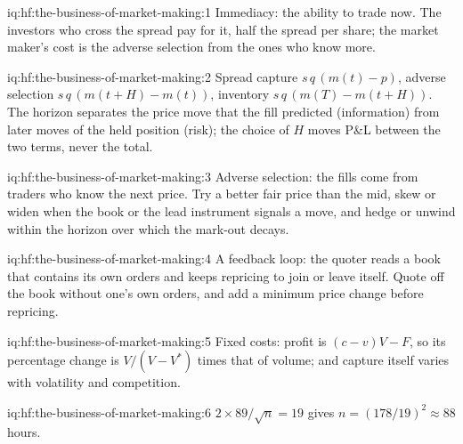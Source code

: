 \begin{solution}{iq:hf:the-business-of-market-making:1}
Immediacy: the ability to trade now. The investors who cross the spread pay for it, half the spread per share; the market maker's cost is the
adverse selection from the ones who know more.
\end{solution}

\begin{solution}{iq:hf:the-business-of-market-making:2}
Spread capture $s\,q\,(m(t)-p)$, adverse selection $s\,q\,(m(t+H)-m(t))$, inventory $s\,q\,(m(T)-m(t+H))$. The horizon separates the price move
that the fill predicted (information) from later moves of the held position (risk); the choice of $H$ moves P\&L between the two terms, never the
total.
\end{solution}

\begin{solution}{iq:hf:the-business-of-market-making:3}
Adverse selection: the fills come from traders who know the next price. Try a better fair price than the mid, skew or widen when the book or the
lead instrument signals a move, and hedge or unwind within the horizon over which the mark-out decays.
\end{solution}

\begin{solution}{iq:hf:the-business-of-market-making:4}
A feedback loop: the quoter reads a book that contains its own orders and keeps repricing to join or leave itself. Quote off the book without one's
own orders, and add a minimum price change before repricing.
\end{solution}

\begin{solution}{iq:hf:the-business-of-market-making:5}
Fixed costs: profit is $(c-v)V-F$, so its percentage change is $V/(V-V^\ast)$ times that of volume; and capture itself varies with volatility and
competition.
\end{solution}

\begin{solution}{iq:hf:the-business-of-market-making:6}
$2\times89/\sqrt n=19$ gives $n=(178/19)^2\approx88$ hours.
\end{solution}
